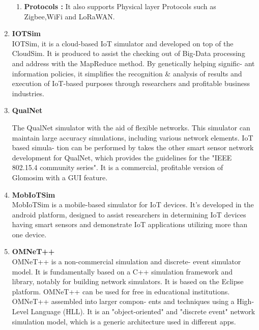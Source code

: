 \documentclass[a4paper,11pt]{article}
\begin{document}
\begin{iotsolution}
\begin{enumerate}[1]
\begin{enumerate}
\item \textbf{Protocols :} It also supports Physical layer Protocols such as Zigbee,WiFi and LoRaWAN.
\end{enumerate}
\vspace{15cm}
\item{\textbf{IOTSim}}\\
IOTSim, it is a cloud-based IoT simulator and developed on top of the CloudSim. It is produced to assist the checking out of Big-Data processing and address with the MapReduce method. By genetically helping signific- ant information policies, it simplifies the recognition & analysis of results and execution of IoT-based purposes through researchers and profitable business industries.

\item{\textbf{QualNet}}

The QualNet simulator with the aid of flexible networks. This simulator can maintain large accuracy simulations, including various network elements. IoT based simula- tion can be performed by takes the other smart sensor network development for QualNet, which provides the guidelines for the "IEEE 802.15.4 community series". It is a commercial, profitable version of Glomosim with a GUI feature.
\item{\textbf{MobIoTSim}}\\
MobIoTSim is a mobile-based simulator for IoT devices. It’s developed in the android platform, designed to assist researchers in determining IoT devices having smart sensors and demonstrate IoT applications utilizing more than one device.

\item{\textbf{OMNeT++}}\\
OMNeT++ is a non-commercial simulation and discrete- event simulator model. It is fundamentally based on a C++ simulation framework and library, notably for building network simulators. It is based on the Eclipse platform. OMNeT++ can be used for free in educational institutions. OMNeT++ assembled into larger compon- ents and techniques using a High-Level Language (HLL). It is an "object-oriented" and "discrete event" network simulation model, which is a generic architecture used in different apps.






\end{enumerate}
\end{iotsolution}
\end{document}
